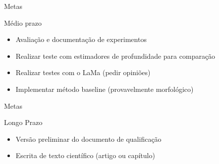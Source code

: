 \documentclass[aspectratio=169]{beamer}
\begin{document}
\begin{frame}{Metas}
    \begin{block}{Médio prazo}
        \begin{itemize}
            \item Avaliação e documentação de experimentos
            \item Realizar teste com estimadores de profundidade para comparação
            \item Realizar testes com o LaMa (pedir opiniões)
            \item Implementar método baseline (provavelmente morfológico)
            \end{itemize}
        \end{block}
\end{frame}


\begin{frame}{Metas}
    \begin{block}{Longo Prazo}
        \begin{itemize}
        \item Versão preliminar do documento de qualificação
        \item Escrita de texto científico (artigo ou capítulo)
    \end{itemize}
    \end{block}
\end{frame}
\end{document}
